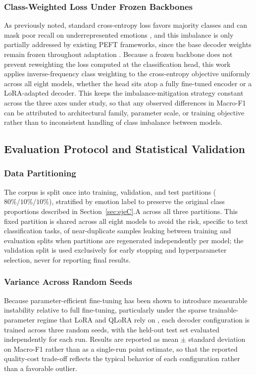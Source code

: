 \documentclass[conference]{IEEEtran}
\begin{document}
\subsubsection{Class-Weighted Loss Under Frozen Backbones}
As previously noted, standard cross-entropy loss favors majority classes and can mask poor recall on underrepresented emotions \cite{maruf2024challenges}, and this imbalance is only partially addressed by existing PEFT frameworks, since the base decoder weights remain frozen throughout adaptation \cite{nwaiwu2025peft}. Because a frozen backbone does not prevent reweighting the loss computed at the classification head, this work applies inverse-frequency class weighting to the cross-entropy objective uniformly across all eight models, whether the head sits atop a fully fine-tuned encoder or a LoRA-adapted decoder. This keeps the imbalance-mitigation strategy constant across the three axes under study, so that any observed differences in Macro-F1 can be attributed to architectural family, parameter scale, or training objective rather than to inconsistent handling of class imbalance between models.

\subsection{Evaluation Protocol and Statistical Validation}

\subsubsection{Data Partitioning}
The corpus is split once into training, validation, and test partitions ($80\%/10\%/10\%$), stratified by emotion label to preserve the original class proportions described in Section~\ref{sec:ejeC}.A across all three partitions. This fixed partition is shared across all eight models to avoid the risk, specific to text classification tasks, of near-duplicate samples leaking between training and evaluation splits when partitions are regenerated independently per model; the validation split is used exclusively for early stopping and hyperparameter selection, never for reporting final results.

\subsubsection{Variance Across Random Seeds}
Because parameter-efficient fine-tuning has been shown to introduce measurable instability relative to full fine-tuning, particularly under the sparse trainable-parameter regime that LoRA and QLoRA rely on \cite{wu2025advlora}, each decoder configuration is trained across three random seeds, with the held-out test set evaluated independently for each run. Results are reported as mean $\pm$ standard deviation on Macro-F1 rather than as a single-run point estimate, so that the reported quality-cost trade-off reflects the typical behavior of each configuration rather than a favorable outlier.
\end{document}
